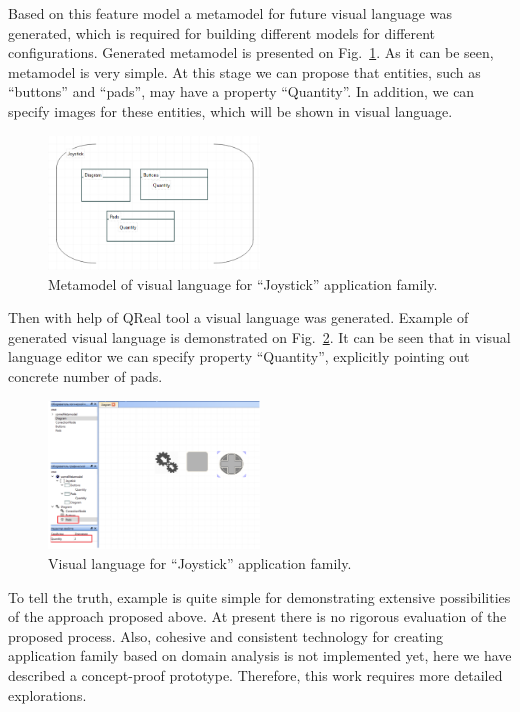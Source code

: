 \documentclass[conference]{IEEEtran}
\begin{document}
Based on this feature model a metamodel for future visual language was generated, which is required for building different models for different configurations. Generated metamodel is presented on Fig.~\ref{image:joystickMetamodel}. As it can be seen, metamodel is very simple. At this stage we can propose that entities, such as ``buttons'' and ``pads'', may have a property ``Quantity''. In addition, we can specify images for these entities, which will be shown in visual language. 

\begin{figure}[H]
	\centering
	\includegraphics[width=0.5\textwidth]{joystickMetamodel.png}
	\caption{Metamodel of visual language for ``Joystick'' application family.}
	\label{image:joystickMetamodel}
\end{figure}

Then with help of QReal tool a visual language was generated. Example of generated visual language is demonstrated on Fig.~\ref{image:joystickDsl}. It can be seen that in visual language editor we can specify property ``Quantity'', explicitly pointing out concrete number of pads. 

\begin{figure}[H]
	\centering
	\includegraphics[width=0.5\textwidth]{joystickDsl.png}
	\caption{Visual language for ``Joystick'' application family.}
	\label{image:joystickDsl}
\end{figure}

To tell the truth, example is quite simple for demonstrating extensive possibilities of the approach proposed above. At present there is no rigorous evaluation of the proposed process. Also, cohesive and consistent technology for creating application family based on domain analysis is not implemented yet, here we have described a concept-proof prototype. Therefore, this work requires more detailed explorations.
\end{document}

